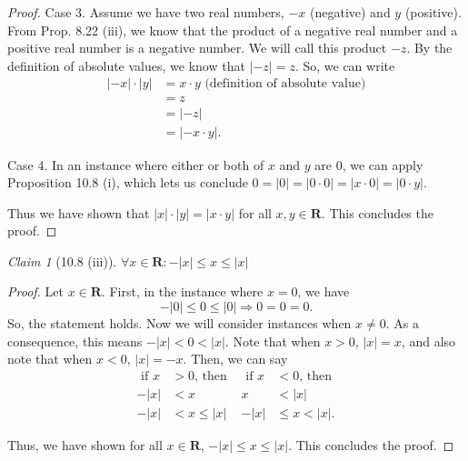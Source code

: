 \documentclass[12pt,oneside]{amsart}
\theoremstyle{remark}
\newtheorem{claim}{Claim}[exer]
\newcommand{\bfR}{\mathbf{R}}
\begin{document}
\begin{proof}
Case 3. Assume we have two real numbers, $-x$ (negative) and $y$ (positive). From Prop. 8.22 (iii), we know that the product of a negative real number and a positive real number is a negative number. We will call this product $-z$. By the definition of absolute values, we know that $|-z| = z$. So, we can write
\begin{equation}
\begin{split}
|-x| \cdot |y| &= x \cdot y \text{ (definition of absolute value)} \\
               &= z \\
               &= |-z| \\
               &= |-x \cdot y|.
\end{split}
\end{equation}

Case 4. In an instance where either or both of $x$ and $y$ are 0, we can apply Proposition 10.8 (i), which lets us conclude $0 = |0| = |0 \cdot 0| = |x \cdot 0| = |0 \cdot y|$.

Thus we have shown that $|x| \cdot |y| = |x \cdot y|$ for all $x, y \in \bfR$. This concludes the proof.
\end{proof}

\begin{claim}[10.8 (iii)]
$\forall x \in \bfR: -|x| \leq x \leq |x|$
\end{claim}
\begin{proof}
Let $x \in \bfR$. First, in the instance where $x = 0$, we have \[ -|0| \leq 0 \leq |0| \Rightarrow 0 = 0 = 0. \] So, the statement holds. Now we will consider instances when $x \neq 0$. As a consequence, this means $-|x| < 0 < |x|$. Note that when $x > 0$, $|x| = x$, and also note that when $x < 0$, $|x| = -x$. Then, we can say
\begin{align*}
\text{ if } x &> 0 \text{, then } & \text{ if } x &< 0 \text{, then } \\
-|x| &< x                 & x &< |x| \\
-|x| &< x \leq |x|        & -|x| &\leq x < |x|.
\end{align*}

Thus, we have shown for all $x \in \bfR$, $-|x| \leq x \leq |x|$. This concludes the proof.
\end{proof}
\end{document}
